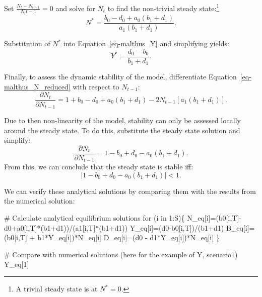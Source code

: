\documentclass[
  letterpaper,
  DIV=11,
  numbers=noendperiod]{scrreprt}
\newenvironment{Shaded}{\begin{snugshade}}{\end{snugshade}}
\newcommand{\CommentTok}[1]{\textcolor[rgb]{0.37,0.37,0.37}{#1}}
\newcommand{\ControlFlowTok}[1]{\textcolor[rgb]{0.00,0.23,0.31}{#1}}
\newcommand{\DecValTok}[1]{\textcolor[rgb]{0.68,0.00,0.00}{#1}}
\newcommand{\NormalTok}[1]{\textcolor[rgb]{0.00,0.23,0.31}{#1}}
\newcommand{\OtherTok}[1]{\textcolor[rgb]{0.00,0.23,0.31}{#1}}
\newcommand{\SpecialCharTok}[1]{\textcolor[rgb]{0.37,0.37,0.37}{#1}}
\begin{document}
Set \(\frac{N_t - N_{t-1}}{N_t{t-1}}=0\) and solve for \(N_{t}\) to find
the non-trivial steady state:\footnote{A trivial steady state is at
  \(N^*=0\).} \[
N^* = \frac{b_0-d_0+a_0(b_1+d_1)}{a_1(b_1+d_1)}.
\]

Substitution of \(N^*\) into Equation~\ref{eq-malthus_Y} and simplifying
yields: \[
Y^* = \frac{d_0-b_0}{b_1+d_1}.
\]

Finally, to assess the dynamic stability of the model, differentiate
Equation~\ref{eq-malthus_N_reduced} with respect to \(N_{t-1}\): \[
\frac{\partial N_t}{\partial N_{t-1}} = 1+b_0-d_0+a_0(b_1+d_1)-2N_{t-1}[a_1(b_1+d_1)].
\]

Due to then non-linearity of the model, stability can only be assessed
locally around the steady state. To do this, substitute the steady state
solution and simplify: \[
\frac{\partial N_t}{\partial N_{t-1}} = 1-b_0+d_0-a_0(b_1+d_1).
\] From this, we can conclude that the steady state is stable iff: \[
 |1-b_0+d_0-a_0(b_1+d_1)| < 1.
\]

We can verify these analytical solutions by comparing them with the
results from the numerical solution:

\begin{Shaded}
\begin{Highlighting}[]
\CommentTok{\# Calculate analytical equilibrium solutions }
\ControlFlowTok{for}\NormalTok{ (i }\ControlFlowTok{in} \DecValTok{1}\SpecialCharTok{:}\NormalTok{S)\{}
\NormalTok{N\_eq[i]}\OtherTok{=}\NormalTok{(b0[i,T]}\SpecialCharTok{{-}}\NormalTok{d0}\SpecialCharTok{+}\NormalTok{a0[i,T]}\SpecialCharTok{*}\NormalTok{(b1}\SpecialCharTok{+}\NormalTok{d1))}\SpecialCharTok{/}\NormalTok{(a1[i,T]}\SpecialCharTok{*}\NormalTok{(b1}\SpecialCharTok{+}\NormalTok{d1))}
\NormalTok{Y\_eq[i]}\OtherTok{=}\NormalTok{(d0}\SpecialCharTok{{-}}\NormalTok{b0[i,T])}\SpecialCharTok{/}\NormalTok{(b1}\SpecialCharTok{+}\NormalTok{d1)}
\NormalTok{B\_eq[i]}\OtherTok{=}\NormalTok{(b0[i,T] }\SpecialCharTok{+}\NormalTok{ b1}\SpecialCharTok{*}\NormalTok{Y\_eq[i])}\SpecialCharTok{*}\NormalTok{N\_eq[i]}
\NormalTok{D\_eq[i]}\OtherTok{=}\NormalTok{(d0 }\SpecialCharTok{{-}}\NormalTok{ d1}\SpecialCharTok{*}\NormalTok{Y\_eq[i])}\SpecialCharTok{*}\NormalTok{N\_eq[i]}
\NormalTok{\}}

\CommentTok{\# Compare with numerical solutions (here for the example of Y, scenario1)}
\NormalTok{Y\_eq[}\DecValTok{1}\NormalTok{]}
\end{Highlighting}
\end{Shaded}
\end{document}

